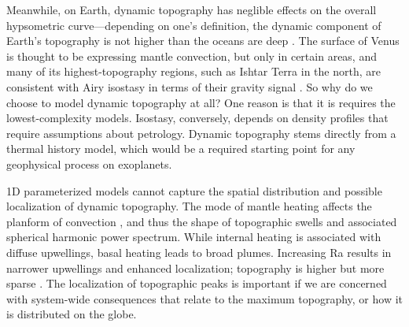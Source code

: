 Meanwhile, on Earth, dynamic topography has neglible effects on the overall hypsometric curve---depending on one's definition, the dynamic component of Earth's topography is not higher than the oceans are deep \citep{Molnar2015, Hoggard2016}. The surface of Venus is thought to be expressing mantle convection, but only in certain areas, and many of its highest-topography regions, such as Ishtar Terra in the north, are consistent with Airy isostasy in terms of their gravity signal \citep{Grimm1991, Yang2016}. So why do we choose to model dynamic topography at all? One reason is that it is requires the lowest-complexity models. Isostasy, conversely, depends on density profiles that require assumptions about petrology. Dynamic topography stems directly from a thermal history model, which would be a required starting point for any geophysical process on exoplanets.

1D parameterized models cannot capture the spatial distribution and possible localization of dynamic topography. The mode of mantle heating affects the planform of convection \citep[e.g.,][]{Choblet2009}, and thus the shape of topographic swells and associated spherical harmonic power spectrum. While internal heating is associated with diffuse upwellings, basal heating leads to broad plumes. Increasing Ra results in narrower upwellings and enhanced localization; topography is higher but more sparse \citep{Bunge1996}. The localization of topographic peaks is important if we are concerned with system-wide consequences that relate to the maximum topography, or how it is distributed on the globe.


